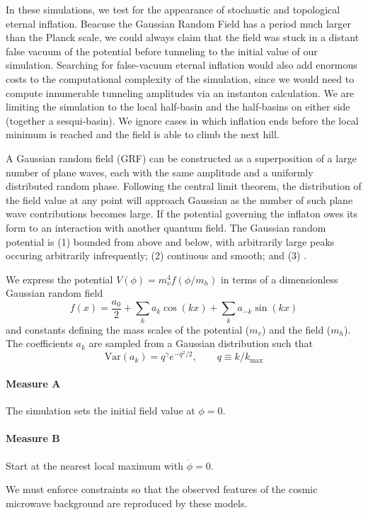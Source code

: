 In these simulations, we test for the appearance of stochastic and topological eternal inflation.  Beacuse the Gaussian Random Field has a period much larger than the Planck scale, we could always claim that the field was stuck in a distant false vacuum of the potential before tunneling to the initial value of our simulation.  Searching for false-vacuum eternal inflation would also add enormous costs to the computational complexity of the simulation, since we would need to compute innumerable tunneling amplitudes via an instanton calculation.  We are limiting the simulation to the local half-basin and the half-basins on either side (together a sesqui-basin).  We ignore cases in which inflation ends before the local minimum is reached and the field is able to climb the next hill.

A Gaussian random field (GRF) can be constructed as a superposition of a large number of plane waves, each with the same amplitude and a uniformly distributed random phase.  Following the central limit theorem, the distribution of the field value at any point will approach Gaussian as the number of such plane wave contributions becomes large.  If the potential governing the inflaton owes its form to an interaction with another quantum field.  The Gaussian random potential is (1) bounded from above and below, with arbitrarily large peaks occuring arbitrarily infrequently; (2) contiuous and smooth; and (3) .

We express the potential $V(\phi) = m_v^4 f(\phi/m_h)$ in terms of a dimensionless Gaussian random field
\[ f(x) = \frac{a_0}{2} + \sum_k a_k \cos(kx) + \sum_k a_{-k} \sin(kx) \]
and constants defining the mass scales of the potential ($m_v$) and the field ($m_h$).
The coefficients $a_k$ are sampled from a Gaussian distribution such that 
\[ \text{Var} (a_k) = q^\gamma e^{-q^2/2}, \qquad q \equiv {k}/{k_{\text{max}}} \]

\paragraph{Measure A} The simulation sets the initial field value at $\phi = 0$.

\paragraph{Measure B} Start at the nearest local maximum with $\dot\phi = 0$.

We must enforce constraints so that the observed features of the cosmic microwave background are reproduced by these models.

